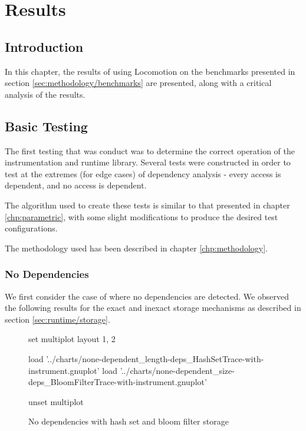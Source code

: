 \chapter{Results} \label{chp:results}
\section{Introduction} \label{sec:results/introduction}
In this chapter, the results of using Locomotion on the benchmarks presented in section \ref{sec:methodology/benchmarks} are presented, along with a critical analysis of the results.

\section{Basic Testing} \label{sec:results/basic}
The first testing that was conduct was to determine the correct operation of the instrumentation and runtime library. Several tests were constructed in order to test at the extremes (for edge cases) of dependency analysis - every access is dependent, and no access is dependent.

The algorithm used to create these tests is similar to that presented in chapter \ref{chp:parametric}, with some slight modifications to produce the desired test configurations.

The methodology used has been described in chapter \ref{chp:methodology}.

	\subsection{No Dependencies} \label{sec:result/basic/no-dep}
	We first consider the case of where no dependencies are detected. We observed the following results for the exact and inexact storage mechanisms as described in section \ref{sec:runtime/storage}.
	
	\begin{figure}[H]
		\centering
		\begin{gnuplot}[terminal=pdf]
		set multiplot layout 1, 2
		
		load '../charts/none-dependent_length-deps_HashSetTrace-with-instrument.gnuplot'
		load '../charts/none-dependent_size-deps_BloomFilterTrace-with-instrument.gnuplot'
		
		unset multiplot
		\end{gnuplot}
		\label{chart:none-dependent-deps-comparison}
		\caption{No dependencies with hash set and bloom filter storage}
	\end{figure}
	
